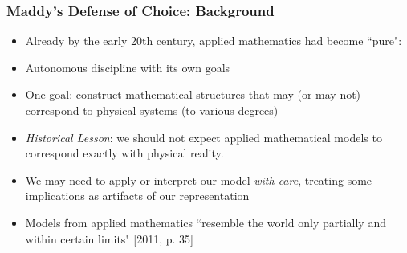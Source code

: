\begin{frame}
\frametitle{Maddy's Defense of Choice: Background}

\begin{itemize}[<+->]

\item Already by the early 20th century, applied mathematics had become ``pure": 

\bi
\item Autonomous discipline with its own goals %

\item One goal: construct mathematical structures that may (or may not) correspond to physical systems (to various degrees)

\ei

\medskip

\item  \emph{Historical Lesson}: we should not expect applied mathematical models to correspond exactly with physical reality. 

\bi
\item We may need to apply or interpret our model \textit{with care}, treating some implications as artifacts of our representation 

\item Models from applied mathematics ``resemble the world only partially and within certain limits" [2011, p. 35]


\ei

\end{itemize}
\end{frame}

